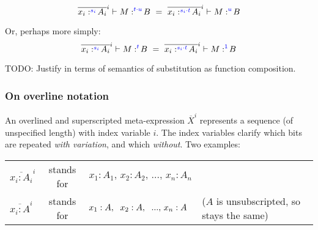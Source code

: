 \documentclass{article}
\newcommand{\todo}[1]{{\color{red}#1}}
\newcommand{\tm}{{\ensuremath{1}}}     %
\newcommand{\tc}{\cdot}         %
\newcommand{\h}[3]{#1 :^{#3}\! {#2}}
\begin{document}
\newcommand{\hilited}{\color{blue}}

\begin{equation}
  \overline{\h{x_i}{A_i}{\hilited s_i}}^i \vdash \h{M}{B}{\hilited t \tc u}
  ~=~
  \overline{\h{x_i}{A_i}{\hilited s_i \tc t}}^i
  \vdash \h{M}{B}{\hilited u}
\end{equation}

Or, perhaps more simply:
\begin{equation}
  \overline{\h{x_i}{A_i}{\hilited s_i}}^i \vdash \h{M}{B}{\hilited t}
  ~=~
  \overline{\h{x_i}{A_i}{\hilited s_i \tc t}}^i
  \vdash \h{M}{B}{\hilited\tm}
\end{equation}

\todo{TODO: Justify in terms of semantics of substitution as function
  composition.}


\subsubsection{On overline notation}

An overlined and superscripted meta-expression $\overline{X}^i$ represents a
sequence (of unspecified length) with index variable $i$. The index variables
clarify which bits are repeated \emph{with variation}, and which \emph{without}.
Two examples:

\begin{center}
  \begin{tabular}{lcll}
    $\overline{x_i : A_i}^i$ & stands for
    & $x_1 : A_1,\, x_2 : A_2,\, ...,\, x_n : A_n$
    \\
    $\overline{x_i : A}^i$ & stands for
    & $x_1 : A,\hspace{0.6em} x_2 : A,\hspace{0.6em} ...,\, x_n : A$
    & ($A$ is unsubscripted, so stays the same)
  \end{tabular}
\end{center}
\end{document}

